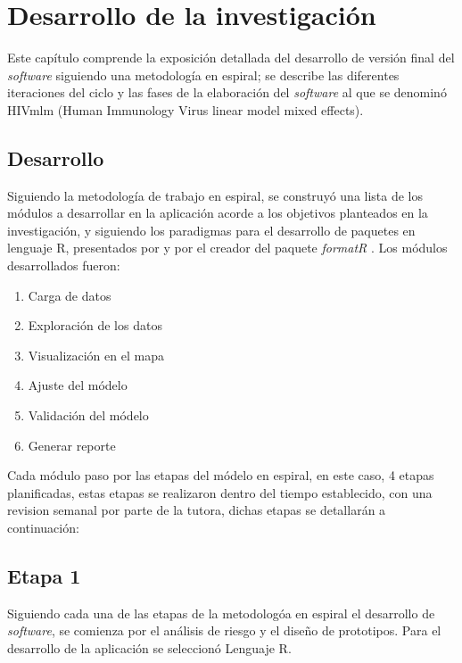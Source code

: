 \chapter{Desarrollo de la investigaci\'on}

Este cap\'itulo comprende la exposici\'on detallada del desarrollo de versi\'on final del \textit{software}  siguiendo una metodolog\'ia en espiral; se describe las diferentes iteraciones del ciclo y las fases de la elaboraci\'on del \textit{software} al que se denomin\'o HIVmlm (Human Immunology Virus linear model mixed effects).\\

\section{Desarrollo}

Siguiendo la metodolog\'ia de trabajo en espiral, se construy\'o  una lista de los m\'odulos a desarrollar en la aplicaci\'on acorde a los objetivos planteados en la investigaci\'on, y siguiendo los paradigmas para el desarrollo de paquetes en lenguaje R, presentados por \citet{test} y por el creador del paquete \emph{formatR} \citet{format}. Los m\'odulos desarrollados fueron:


\begin{enumerate}
\item Carga de datos
\item Exploraci\'on de los datos
\item Visualizaci\'on en el mapa
\item Ajuste del m\'odelo
\item Validaci\'on del m\'odelo
\item Generar reporte
\end{enumerate}
   
 Cada m\'odulo paso por las etapas del m\'odelo en espiral, en este caso, 4 etapas planificadas, estas etapas se realizaron dentro del tiempo establecido, con una revision semanal por parte de la tutora, dichas etapas se detallar\'an a continuaci\'on:

\section{Etapa 1}

Siguiendo cada una de las etapas de la metodologóa en espiral el desarrollo de \textit{software}, se comienza por el an\'alisis de riesgo y el dise\~no de prototipos. Para el desarrollo de la aplicaci\'on se seleccion\'o Lenguaje R. \\

